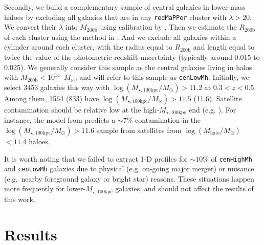 \documentclass[a4paper,fleqn,usenatbib]{mnras}
\def\msun{$M_\odot$}
\def\redm{\texttt{redMaPPer}}
\def\rbcg{\texttt{cenHighMh}}
\def\nbcg{\texttt{cenLowMh}}
\def\logmh{{$\log (M_{\mathrm{halo}}/M_{\odot})$}}
\def\mtot{{$M_{\star,100\mathrm{kpc}}$}}
\def\logmtot{{$\log (M_{\star,100\mathrm{kpc}}/M_{\odot})$}}
\begin{document}
    Secondly, we build a complementary sample of central galaxies in lower-mass haloes
    by excluding all galaxies that are in any \redm{} cluster with $\lambda > 20$.
    We convert their $\lambda$ into $M_{\mathrm{200b}}$ using calibration by 
    \citet{Simet2016}. 
    Then we estimate the $R_{\mathrm{200b}}$ of each cluster using the method in 
    \citet{Diemer2015}. 
    And we exclude all galaxies within a cylinder around each cluster, with the radius
    equal to $R_{\mathrm{200b}}$ and length equal to twice the value of the photometric 
    redshift uncertainty (typically around 0.015 to 0.025). 
    We generally consider this sample as the central galaxies living in halos with
    $M_{\mathrm{200b}} < 10^{14}$~\msun{}, and will refer to this sample as \nbcg{}.
    Initially, we select 3453 galaxies this way with \logmtot{}$> 11.2$ at 
    $0.3 < z < 0.5$. 
    Among them, 1564 (833) have \logmtot{}$> 11.5$ (11.6). 
    Satellite contamination should be relative low at the high-\mtot{} end
    (e.g. \citealt{Reid2014, Hoshino2015, Saito2016, vanUitert2016}). 
    For instance, the model from \citet{Saito2016} predicts a $\sim 7$\% 
    contamination in the \logmtot{}$>11.6$ sample from satellites from 
    \logmh$<11.4$ haloes.
    
    It is worth noting that we failed to extract 1-D profiles for $\sim10$\% of 
    \rbcg{} and \nbcg{} galaxies due to physical (e.g. on-going major merger) or 
    nuisance (e.g.\ nearby foreground galaxy or bright star) reasons. 
    These situations happen more frequently for lower-\mtot{} galaxies, and should not 
    affect the results of this work.
    

\section{Results}
    \label{sec:result}
    
    
    
\end{document}
